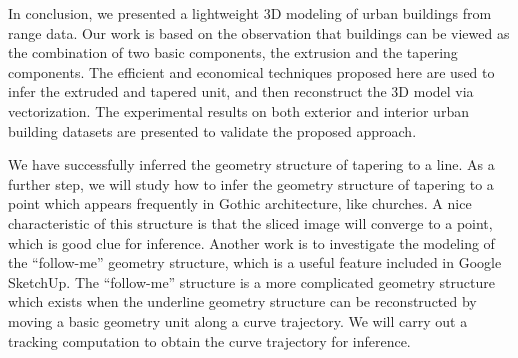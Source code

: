 \documentclass{acmsiggraph}                     %
\begin{document}
In conclusion, we presented a lightweight 3D modeling of urban buildings from range data.
Our work is based on the observation that buildings can be
viewed as the combination of two basic components, the extrusion and the tapering components.
The efficient and economical techniques proposed here are used to infer
the extruded and tapered unit, and then reconstruct the 3D model via vectorization.
The experimental results on both exterior and interior urban building datasets are presented
to validate the proposed approach.

We have successfully inferred the geometry structure of tapering to a line. As a further step, we will study
how to infer the geometry structure of tapering to a point which appears frequently in Gothic architecture,
like churches. A nice characteristic of this structure is that
the sliced image will converge to a point, which is good clue for inference.
Another work is to investigate the modeling of the ``follow-me'' geometry structure, which
is a useful feature included in Google SketchUp.
The ``follow-me'' structure is a more complicated geometry structure which
exists when the underline geometry structure can be reconstructed by
moving a basic geometry unit along a curve trajectory.
We will carry out a tracking computation to obtain the curve trajectory for inference.





\end{document}
